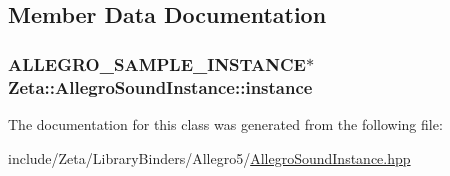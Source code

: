 \subsection{Member Data Documentation}
\hypertarget{classZeta_1_1AllegroSoundInstance_a92a840b4c42200f0e6706d2b4df308e7}{
\subsubsection[{instance}]{\setlength{\rightskip}{0pt plus 5cm}A\+L\+L\+E\+G\+R\+O\+\_\+\+S\+A\+M\+P\+L\+E\+\_\+\+I\+N\+S\+T\+A\+N\+C\+E$\ast$ Zeta\+::\+Allegro\+Sound\+Instance\+::instance\hspace{0.3cm}{\ttfamily [private]}}}\label{classZeta_1_1AllegroSoundInstance_a92a840b4c42200f0e6706d2b4df308e7}


The documentation for this class was generated from the following file\+:\begin{DoxyCompactItemize}
\item 
include/\+Zeta/\+Library\+Binders/\+Allegro5/\hyperlink{AllegroSoundInstance_8hpp}{Allegro\+Sound\+Instance.\+hpp}\end{DoxyCompactItemize}

